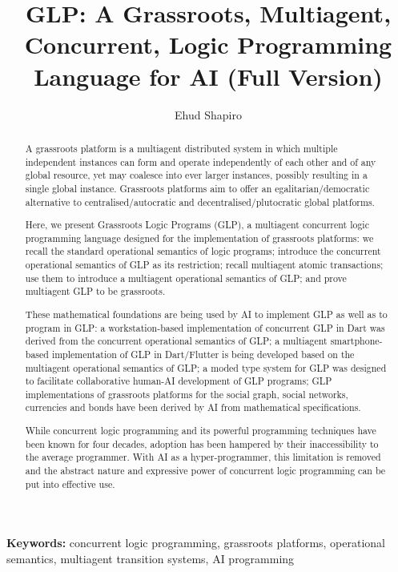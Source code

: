 \documentclass[copyright,creativecommons]{eptcs}
\title{GLP: A Grassroots, Multiagent, Concurrent, Logic Programming Language for AI\ifappendix{} (Full Version)\fi}
\author{Ehud Shapiro
\institute{London School of Economics and Weizmann Institute of Science}
}
\theoremstyle{definition}
\theoremstyle{plain}
\theoremstyle{remark}
\newif\ifappendix
\newenvironment{keywords}{\par\smallskip\noindent\textbf{Keywords:} }{}
\begin{document}
\maketitle

\begin{abstract}
A grassroots platform is a multiagent distributed system in which multiple independent instances can form and operate independently of each other and of any global resource, yet may coalesce into ever larger instances, possibly resulting in a single global instance. Grassroots platforms aim to offer an egalitarian/democratic alternative to centralised/autocratic and decentralised/plutocratic global platforms.

Here, we present Grassroots Logic Programs (GLP), a multiagent concurrent logic programming language designed for the implementation of grassroots platforms: we recall the standard operational semantics of logic programs; introduce the concurrent operational semantics of GLP as its restriction; recall multiagent atomic transactions; use them to introduce a multiagent operational semantics of GLP; and prove multiagent GLP to be grassroots.

These mathematical foundations are being used by AI to implement GLP as well as to program in GLP: a workstation-based implementation of concurrent GLP in Dart was derived from the concurrent operational semantics of GLP; a multiagent smartphone-based implementation of GLP in Dart/Flutter is being developed based on the multiagent operational semantics of GLP; a moded type system for GLP was designed to facilitate collaborative human-AI development of GLP programs; GLP implementations of grassroots platforms for the social graph, social networks, currencies and bonds have been derived by AI from mathematical specifications.

While concurrent logic programming and its powerful programming techniques have been known for four decades, adoption has been hampered by their inaccessibility to the average programmer. With AI as a hyper-programmer, this limitation is removed and the abstract nature and expressive power of concurrent logic programming can be put into effective use.
\end{abstract}

\begin{keywords}
concurrent logic programming, grassroots platforms, operational semantics, multiagent transition systems, AI programming
\end{keywords}











\ifappendix
\appendix







\fi
\end{document}
